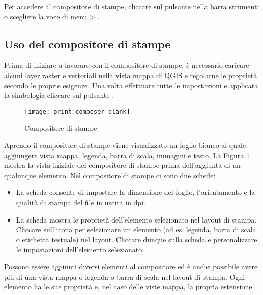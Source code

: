 Per accedere al compositore di stampe, cliccare sul pulsante
 nella barra strumenti o scegliere la voce
di menu  > .

\subsection{Uso del compositore di stampe}\label{label_useprintcomposer} 

Prima di iniziare a lavorare con il compositore di stampe, è necessario
caricare alcuni layer raster e vettoriali nella vista mappa di QGIS e
regolarne le proprietà secondo le proprie esigenze. Una volta effettuate
tutte le impostazioni e applicata la simbologia cliccare sul pulsante
.

\begin{figure}[ht]
   \begin{center}
   \caption{Compositore di stampe \nixcaption}\label{fig:print_composer_blank}\smallskip
   \texttt{[image: print\_composer\_blank]}
\end{center}  
\end{figure}

Aprendo il compositore di stampe viene visualizzato un foglio bianco al quale
aggiungere vista mappa, legenda, barra di scala, immagini e testo. La Figura
\ref{fig:print_composer_blank} mostra la vista iniziale del compositore di
stampe prima dell'aggiunta di un qualunque elemento. Nel compositore di stampe
ci sono due schede:

\begin{itemize}
\item La scheda  consente di impostare la dimensione del
foglio, l'orientamento e la qualità di stampa del file in uscita in dpi.
\item La scheda  mostra le proprietà dell'elemento selezionato
nel layout di stampa. 
Cliccare sull'icona  
per selezionare un elemento (ad es. legenda, barra di scala o etichetta
testuale) nel layout. Cliccare dunque sulla scheda  e
personalizzare le impostazioni dell'elemento selezionato.
\end{itemize}

Possono essere aggiunti diversi elementi al compositore ed è anche
possibile avere più di una vista mappa o legenda o barra di scala nel layout
di stampa. Ogni elemento ha le sue proprietà e, nel caso delle viste mappa, la
propria estensione.

